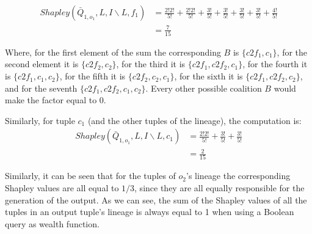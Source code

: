 \[
\begin{array}{ll}
	Shapley(\bar{Q}_{1, o_1}, L, I \backslash L, f_1) & = \frac{2!2!}{5!} + \frac{2!2!}{5!} + \frac{3!}{5!} + \frac{3!}{5!}  + \frac{3!}{5!} + \frac{3!}{5!} + \frac{4!}{5!}\\
	& = \frac{7}{15}
\end{array}
\]

Where, for the first element of the sum the corresponding $B$ is $\{c2f_1, c_1\}$, for the second element it is $\{c2f_2, c_2\}$, for the third it is $\{c2f_1, c2f_2, c_1\}$, for the fourth it is $\{c2f_1, c_1, c_2\}$, for the fifth it is $\{c2f_2, c_2, c_1\}$, for the sixth it is $\{c2f_1, c2f_2, c_2\}$, and for the seventh $\{c2f_1, c2f_2, c_1, c_2\}$. Every other possible coalition $B$ would make the factor equal to $0$.

Similarly, for tuple $c_1$ (and the other tuples of the lineage), the computation is:
\[
\begin{array}{ll}
	Shapley(\bar{Q}_{1, o_1}, L, I \backslash L, c_1) & = \frac{2!2!}{5!} + \frac{3!}{5!} + \frac{3!}{5!}\\
	& = \frac{2}{15}
\end{array}
\]

Similarly, it can be seen that for the tuples of $o_2$'s lineage the corresponding Shapley values are all equal to $1/3$, since they are all equally responsible for the generation of the output.
As we can see, the sum of the Shapley values of all the tuples in an output tuple's lineage is always equal to 1 when using a Boolean query as wealth function. 




